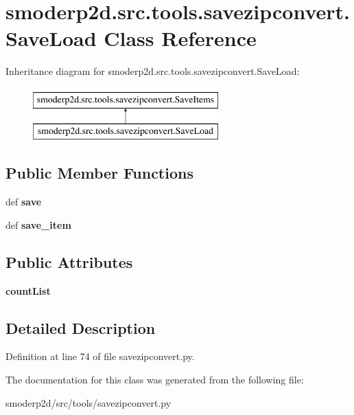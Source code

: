 \hypertarget{classsmoderp2d_1_1src_1_1tools_1_1savezipconvert_1_1SaveLoad}{\section{smoderp2d.\-src.\-tools.\-savezipconvert.\-Save\-Load Class Reference}
\label{classsmoderp2d_1_1src_1_1tools_1_1savezipconvert_1_1SaveLoad}
}
Inheritance diagram for smoderp2d.\-src.\-tools.\-savezipconvert.\-Save\-Load\-:\begin{figure}[H]
\begin{center}
\leavevmode
\includegraphics[height=2.000000cm]{d3/dda/classsmoderp2d_1_1src_1_1tools_1_1savezipconvert_1_1SaveLoad}
\end{center}
\end{figure}
\subsection*{Public Member Functions}
\begin{DoxyCompactItemize}
\item 
\hypertarget{classsmoderp2d_1_1src_1_1tools_1_1savezipconvert_1_1SaveLoad_a054ff307ab4f5403c31243f9d00eb953}{def {\bfseries save}}\label{classsmoderp2d_1_1src_1_1tools_1_1savezipconvert_1_1SaveLoad_a054ff307ab4f5403c31243f9d00eb953}

\item 
\hypertarget{classsmoderp2d_1_1src_1_1tools_1_1savezipconvert_1_1SaveLoad_a3ab39289191759cf2f7159c9dca7f83a}{def {\bfseries save\-\_\-item}}\label{classsmoderp2d_1_1src_1_1tools_1_1savezipconvert_1_1SaveLoad_a3ab39289191759cf2f7159c9dca7f83a}

\end{DoxyCompactItemize}
\subsection*{Public Attributes}
\begin{DoxyCompactItemize}
\item 
\hypertarget{classsmoderp2d_1_1src_1_1tools_1_1savezipconvert_1_1SaveLoad_af128345f0d5fc0833600801586caebe8}{{\bfseries count\-List}}\label{classsmoderp2d_1_1src_1_1tools_1_1savezipconvert_1_1SaveLoad_af128345f0d5fc0833600801586caebe8}

\end{DoxyCompactItemize}


\subsection{Detailed Description}


Definition at line 74 of file savezipconvert.\-py.



The documentation for this class was generated from the following file\-:\begin{DoxyCompactItemize}
\item 
smoderp2d/src/tools/savezipconvert.\-py\end{DoxyCompactItemize}
